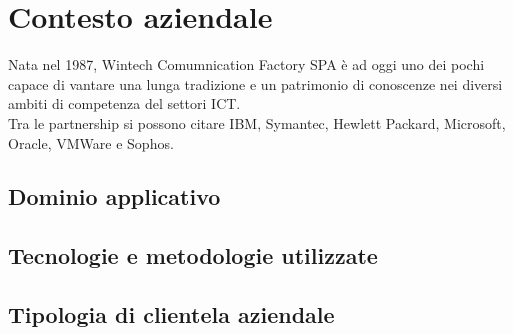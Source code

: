 \documentclass[Tesi.tex]{subfiles}
\begin{document}
\chapter{Contesto aziendale}

Nata nel 1987, Wintech Comumnication Factory SPA è ad oggi uno dei pochi  capace di vantare una lunga tradizione e un patrimonio di conoscenze nei diversi ambiti di competenza del settori ICT. \\
Tra le partnership si possono citare IBM, Symantec, Hewlett Packard, Microsoft, Oracle, VMWare e Sophos.

\section{Dominio applicativo}


\section{Tecnologie e metodologie utilizzate}


\section{Tipologia di clientela aziendale}
\end{document}
